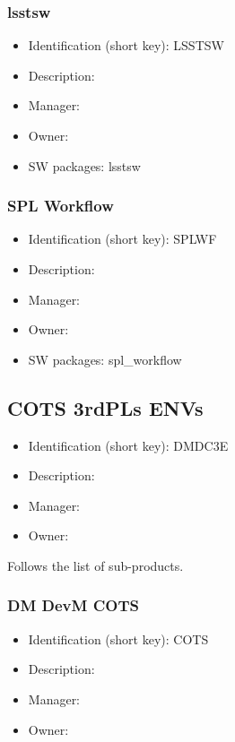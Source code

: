 \subsubsection{lsstsw}\label{sect:LSSTSW}
\begin{itemize}
\item Identification (short key): LSSTSW
\item Description: 
\item Manager: 
\item Owner: 
\item SW packages: lsstsw
\end{itemize}

\subsubsection{SPL Workflow}\label{sect:SPLWF}
\begin{itemize}
\item Identification (short key): SPLWF
\item Description: 
\item Manager: 
\item Owner: 
\item SW packages: spl\_workflow
\end{itemize}

\subsection{COTS 3rdPLs ENVs}\label{sect:DMDC3E}
\begin{itemize}
\item Identification (short key): DMDC3E
\item Description: 
\item Manager: 
\item Owner: 
\end{itemize}

Follows the list of sub-products.\subsubsection{DM DevM COTS}\label{sect:COTS}
\begin{itemize}
\item Identification (short key): COTS
\item Description: 
\item Manager: 
\item Owner: 
\end{itemize}

